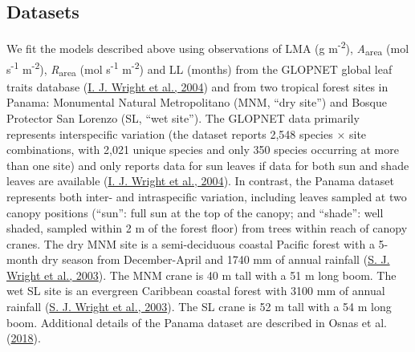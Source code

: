 \documentclass[
  12pt,
  letterpaper,
  DIV=11,
  numbers=noendperiod]{scrartcl}
\begin{document}
\hypertarget{datasets}{%
\subsection{Datasets}\label{datasets}}

We fit the models described above using observations of LMA (g
m\textsuperscript{-2}), \emph{A}\textsubscript{area} (mol
s\textsuperscript{-1} m\textsuperscript{-2}),
\emph{R}\textsubscript{area} (mol s\textsuperscript{-1}
m\textsuperscript{-2}) and LL (months) from the GLOPNET global leaf
traits database (\protect\hyperlink{ref-Wright2004a}{I. J. Wright et
al., 2004}) and from two tropical forest sites in Panama: Monumental
Natural Metropolitano (MNM, ``dry site'') and Bosque Protector San
Lorenzo (SL, ``wet site''). The GLOPNET data primarily represents
interspecific variation (the dataset reports 2,548 species \(\times\)
site combinations, with 2,021 unique species and only 350 species
occurring at more than one site) and only reports data for sun leaves if
data for both sun and shade leaves are available
(\protect\hyperlink{ref-Wright2004a}{I. J. Wright et al., 2004}). In
contrast, the Panama dataset represents both inter- and intraspecific
variation, including leaves sampled at two canopy positions (``sun'':
full sun at the top of the canopy; and ``shade'': well shaded, sampled
within 2 m of the forest floor) from trees within reach of canopy
cranes. The dry MNM site is a semi-deciduous coastal Pacific forest with
a 5-month dry season from December-April and 1740 mm of annual rainfall
(\protect\hyperlink{ref-Wright2003}{S. J. Wright et al., 2003}). The MNM
crane is 40 m tall with a 51 m long boom. The wet SL site is an
evergreen Caribbean coastal forest with 3100 mm of annual rainfall
(\protect\hyperlink{ref-Wright2003}{S. J. Wright et al., 2003}). The SL
crane is 52 m tall with a 54 m long boom. Additional details of the
Panama dataset are described in Osnas et al.
(\protect\hyperlink{ref-Osnas2018}{2018}).
\end{document}

